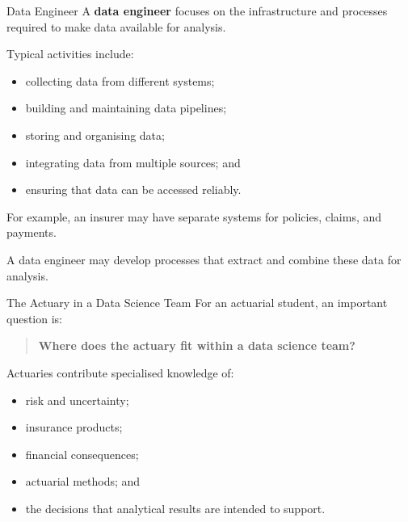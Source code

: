 \documentclass[
  ignorenonframetext,
  aspectratio=169,
]{beamer}
\providecommand{\tightlist}{%
  \setlength{\itemsep}{0pt}\setlength{\parskip}{0pt}}
\begin{document}
\begin{frame}{Data Engineer}
\protect{}\label{data-engineer}
A \textbf{data engineer} focuses on the infrastructure and processes
required to make data available for analysis.

Typical activities include:

\begin{itemize}
\tightlist
\item
  collecting data from different systems;
\item
  building and maintaining data pipelines;
\item
  storing and organising data;
\item
  integrating data from multiple sources; and
\item
  ensuring that data can be accessed reliably.
\end{itemize}

For example, an insurer may have separate systems for policies, claims,
and payments.

A data engineer may develop processes that extract and combine these
data for analysis.
\end{frame}

\begin{frame}{The Actuary in a Data Science Team}
\protect{}\label{the-actuary-in-a-data-science-team}
For an actuarial student, an important question is:

\begin{quote}
\textbf{Where does the actuary fit within a data science team?}
\end{quote}

Actuaries contribute specialised knowledge of:

\begin{itemize}
\tightlist
\item
  risk and uncertainty;
\item
  insurance products;
\item
  financial consequences;
\item
  actuarial methods; and
\item
  the decisions that analytical results are intended to support.
\end{itemize}
\end{frame}
\end{document}
